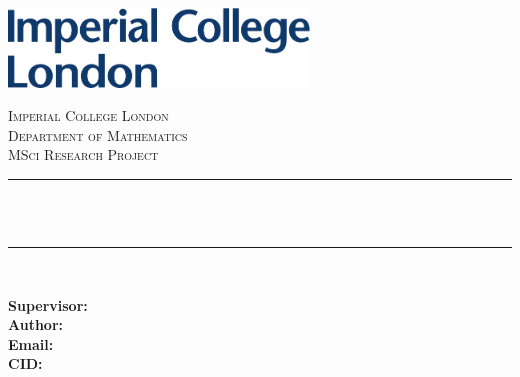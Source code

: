 \begin{titlepage}

\newcommand{\HRule}{\rule{\linewidth}{0.5mm}} %


\includegraphics[width=8cm]{title/logo.pdf}
\vspace{40pt}
 

\center %


\textsc{\LARGE Imperial College London}\\[0.5cm] %
\textsc{\Large Department of Mathematics}\\[1.5cm] %
\textsc{\Large MSci Research Project}\\[0.5cm] %

\makeatletter
\HRule \\[0.6cm]
{ \huge \bfseries \reporttitle}\\[0.6cm] %
\HRule \\[1.5cm]
 

\begin{minipage}{0.45\textwidth}
\begin{center} \large 
    \begin{flushleft}
\textbf{Supervisor:} \supervisor \\
\textbf{Author:} \reportauthor \\
\textbf{Email:} \email \\
\textbf{CID:} \CID \\
\vspace{11pt}
\hrulefill \\
\vspace{11pt}
        

\end{flushleft}
\end{center}
\end{minipage}
\end{titlepage}
